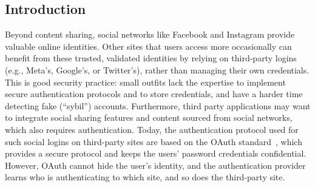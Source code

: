 \documentclass[11pt]{article}
\date{}							%
\begin{document}


\subsection*{Introduction}
Beyond content sharing, social networks like Facebook and Instagram provide valuable online identities. Other sites that users access more occasionally can benefit from these trusted, validated identities by relying on third-party logins (e.g., Meta’s, Google’s, or Twitter’s), rather than managing their own credentials. This is good security practice: small outfits lack the expertise to implement secure authentication protocols and to store credentials, and have a harder time detecting fake (“sybil”) accounts. Furthermore, third party applications may want to integrate social sharing features and content sourced from social networks, which also requires authentication. Today, the authentication protocol used for such social logins on third-party sites are based on the OAuth standard~\cite{oauth}, which provides a secure protocol and keeps the users’ password credentials confidential. However, OAuth cannot hide the user’s identity, and the authentication provider learns who is authenticating to which site, and so does the third-party site.
\end{document}
